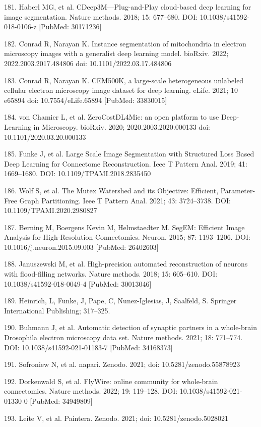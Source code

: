 \documentclass{article}
\begin{document}
\begin{hangpars}
181. Haberl MG, et al. CDeep3M—Plug-and-Play cloud-based deep learning for image segmentation. Nature methods. 2018; 15: 677–680. DOI: 10.1038/s41592-018-0106-z [PubMed: 30171236]

182. Conrad R, Narayan K. Instance segmentation of mitochondria in electron microscopy images with a generalist deep learning model. bioRxiv. 2022; 2022.2003.2017.484806 doi: 10.1101/2022.03.17.484806

183. Conrad R, Narayan K. CEM500K, a large-scale heterogeneous unlabeled cellular electron microscopy image dataset for deep learning. eLife. 2021; 10 e65894 doi: 10.7554/eLife.65894 [PubMed: 33830015]

184. von Chamier L, et al. ZeroCostDL4Mic: an open platform to use Deep-Learning in Microscopy. bioRxiv. 2020; 2020.2003.2020.000133 doi: 10.1101/2020.03.20.000133

185. Funke J, et al. Large Scale Image Segmentation with Structured Loss Based Deep Learning for Connectome Reconstruction. Ieee T Pattern Anal. 2019; 41: 1669–1680. DOI: 10.1109/TPAMI.2018.2835450

186. Wolf S, et al. The Mutex Watershed and its Objective: Efficient, Parameter-Free Graph Partitioning. Ieee T Pattern Anal. 2021; 43: 3724–3738. DOI: 10.1109/TPAMI.2020.2980827

187. Berning M, Boergens Kevin M, Helmstaedter M. SegEM: Efficient Image Analysis for High-Resolution Connectomics. Neuron. 2015; 87: 1193–1206. DOI: 10.1016/j.neuron.2015.09.003 [PubMed: 26402603]

188. Januszewski M, et al. High-precision automated reconstruction of neurons with flood-filling networks. Nature methods. 2018; 15: 605–610. DOI: 10.1038/s41592-018-0049-4 [PubMed: 30013046]

189. Heinrich, L, Funke, J, Pape, C, Nunez-Iglesias, J, Saalfeld, S. Springer International Publishing; 317–325.

190. Buhmann J, et al. Automatic detection of synaptic partners in a whole-brain Drosophila electron microscopy data set. Nature methods. 2021; 18: 771–774. DOI: 10.1038/s41592-021-01183-7 [PubMed: 34168373]

191. Sofroniew N, et al. napari. Zenodo. 2021; doi: 10.5281/zenodo.55878923

192. Dorkenwald S, et al. FlyWire: online community for whole-brain connectomics. Nature methods. 2022; 19: 119–128. DOI: 10.1038/s41592-021-01330-0 [PubMed: 34949809]

193. Leite V, et al. Paintera. Zenodo. 2021; doi: 10.5281/zenodo.5028021


\end{hangpars}
\end{document}

